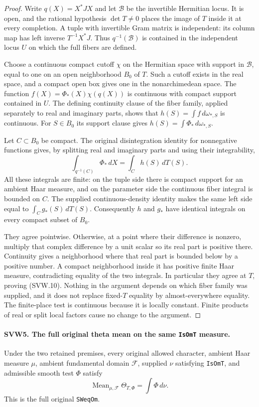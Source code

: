 \begin{proof}
Write $q(X)=X^*JX$ and let $\mathcal B$ be the invertible Hermitian
locus.  It is open, and the rational hypothesis $\det T\ne0$
places the image of $T$ inside it at every completion.  A tuple
with invertible Gram matrix is independent: its column map has
left inverse $T^{-1}X^*J$.  Thus $q^{-1}(\mathcal B)$ is contained
in the independent locus $U$ on which the full fibers are defined.

Choose a continuous compact cutoff $\chi$ on the Hermitian space
with support in $\mathcal B$, equal to one on an open neighborhood
$B_0$ of $T$.  Such a cutoff exists in the real space, and a compact
open box gives one in the nonarchimedean space.  The function
$f(X)=\Phi_*(X)\chi(q(X))$ is continuous with compact support
contained in $U$.  The defining continuity clause of the fiber
family, applied separately to real and imaginary parts, shows that
$h(S)=\int f\,d\omega_{*,S}$ is continuous.  For $S\in B_0$ its
support clause gives $h(S)=\int\Phi_*\,d\omega_{*,S}$.

Let $C\subset B_0$ be compact.  The original disintegration identity
for nonnegative functions gives, by splitting real and imaginary
parts and using their integrability,
\[
 \int_{q^{-1}(C)}\Phi_*\,dX
     =\int_C h(S)\,dT(S).
 \tag{SVW.11}
\]
All these integrals are finite: on the tuple side there is compact
support for an ambient Haar measure, and on the parameter side the
continuous fiber integral is bounded on $C$.  The supplied
continuous-density identity makes the same left side equal to
$\int_C g_*(S)\,dT(S)$.  Consequently $h$ and $g_*$ have identical
integrals on every compact subset of $B_0$.

They agree pointwise.  Otherwise, at a point where their difference
is nonzero, multiply that complex difference by a unit scalar so
its real part is positive there.  Continuity gives a neighborhood
where that real part is bounded below by a positive number.  A
compact neighborhood inside it has positive finite Haar measure,
contradicting equality of the two integrals.  In particular they
agree at $T$, proving (SVW.10).  Nothing in the argument depends on
which fiber family was supplied, and it does not replace fixed-$T$
equality by almost-everywhere equality.  The finite-place test is
continuous because it is locally constant.  Finite products of
real or split local factors cause no change to the argument.
\end{proof}

\paragraph{SVW5. The full original theta mean on the same \texttt{IsOmT} measure.}
\label{claim:SVW5}
Under the two retained premises, every original allowed character,
ambient Haar measure $\mu$, ambient fundamental domain $\mathcal F$,
supplied $\nu$ satisfying \texttt{IsOmT}, and admissible smooth test
$\Phi$ satisfy
\[
           \operatorname{Mean}_{\mu,\mathcal F}\Theta_{T,\Phi}
                          =\int\Phi\,d\nu.
 \tag{SVW.12}
\]
This is the full original \texttt{SWeqOm}.

